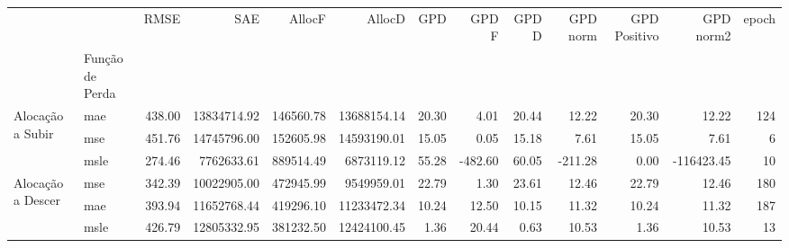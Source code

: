 \begin{tabular}{llrrrrrrrrrrr}
\toprule
 &  & RMSE & SAE & AllocF & AllocD & GPD & GPD F & GPD D & GPD norm & GPD Positivo & GPD norm2 & epoch \\
 & Função de Perda &  &  &  &  &  &  &  &  &  &  &  \\
\midrule
\multirow[t]{3}{*}{Alocação a Subir} & mae & 438.00 & 13834714.92 & 146560.78 & 13688154.14 & 20.30 & 4.01 & 20.44 & 12.22 & 20.30 & 12.22 & 124 \\
 & mse & 451.76 & 14745796.00 & 152605.98 & 14593190.01 & 15.05 & 0.05 & 15.18 & 7.61 & 15.05 & 7.61 & 6 \\
 & msle & 274.46 & 7762633.61 & 889514.49 & 6873119.12 & 55.28 & -482.60 & 60.05 & -211.28 & 0.00 & -116423.45 & 10 \\
\cline{1-13}
\multirow[t]{3}{*}{Alocação a Descer} & mse & 342.39 & 10022905.00 & 472945.99 & 9549959.01 & 22.79 & 1.30 & 23.61 & 12.46 & 22.79 & 12.46 & 180 \\
 & mae & 393.94 & 11652768.44 & 419296.10 & 11233472.34 & 10.24 & 12.50 & 10.15 & 11.32 & 10.24 & 11.32 & 187 \\
 & msle & 426.79 & 12805332.95 & 381232.50 & 12424100.45 & 1.36 & 20.44 & 0.63 & 10.53 & 1.36 & 10.53 & 13 \\
\cline{1-13}
\bottomrule
\end{tabular}
